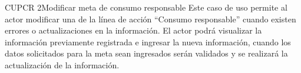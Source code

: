 \begin{UseCase}{CUPCR 2}{Modificar meta de consumo responsable}
	{
		Este caso de uso permite al actor modificar una  de la línea de acción ``Consumo responsable'' cuando existen errores o actualizaciones en la información. 
		El actor podrá visualizar la información previamente registrada e ingresar la nueva información, cuando los datos solicitados para la meta
		sean ingresados serán validados y se realizará la actualización de la información.
	}


\end{UseCase}
